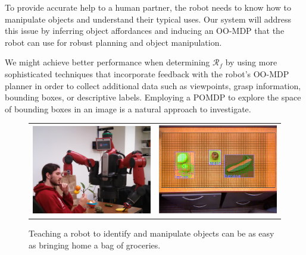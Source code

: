 \documentclass[12pt]{article}
\numberwithin{equation}{section}
\numberwithin{table}{section}
\numberwithin{figure}{section}
\begin{document}
To provide accurate help
to a human partner, the robot needs to know how to manipulate objects and understand their typical uses.
Our system will address this issue by inferring object affordances and inducing an OO-MDP \cite{OOMDP} that the robot
can use for robust planning and object manipulation.

We might achieve better performance when determining $\mathcal{R}_f$
by using more sophisticated techniques that incorporate feedback with the robot's OO-MDP planner in 
order to collect additional data such as viewpoints, grasp information, bounding boxes, or descriptive labels.  
Employing a POMDP \cite{POMDP} to explore the space of bounding boxes in an image is a natural approach to investigate.

\begin{figure}
  \begin{center}
    \begin{tabular}{l c}
      \includegraphics[width=200px, height=150px]{robo2.png} &
      \includegraphics[width=200px, height=150px]{screen2.png} \\
    \end{tabular}
  \end{center}
  \caption{Teaching a robot to identify and manipulate objects can be as easy as bringing home
	    a bag of groceries.}
\end{figure}

\end{document}
